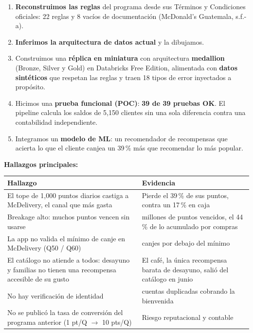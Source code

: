 \documentclass[12pt,a4paper]{article}
\begin{document}
\begin{enumerate}[leftmargin=1.4em]
\item \textbf{Reconstruimos las reglas} del programa desde sus Términos y Condiciones oficiales:
22 reglas y 8 vacíos de documentación (McDonald's Guatemala, s.f.-a).
\item \textbf{Inferimos la arquitectura de datos actual} y la dibujamos.
\item Construimos una \textbf{réplica en miniatura} con arquitectura \textbf{medallion} (Bronze,
Silver y Gold) en Databricks Free Edition, alimentada con \textbf{datos sintéticos} que respetan
las reglas y traen 18 tipos de error inyectados a propósito.
\item Hicimos una \textbf{prueba funcional (POC)}: \textbf{39 de 39 pruebas OK}. El pipeline
calcula los saldos de 5,150 clientes sin una sola diferencia contra una contabilidad
independiente.
\item Integramos un \textbf{modelo de ML}: un recomendador de recompensas que acierta lo que el
cliente canjea un 39\,\% más que recomendar lo más popular.
\end{enumerate}

\textbf{Hallazgos principales:}

\begin{center}
\renewcommand{\arraystretch}{1.4}
\begin{tabular}{|>{\raggedright\arraybackslash}p{7.2cm}|>{\raggedright\arraybackslash}p{6.4cm}|}
\hline
\textbf{Hallazgo} & \textbf{Evidencia} \\
\hline
El tope de 1,000 puntos diarios castiga a McDelivery, el canal que más gasta & Pierde el 39\,\%
de sus puntos, contra un 17\,\% en caja \\
\hline
Breakage alto: muchos puntos vencen sin usarse & 8.1 millones de puntos vencidos, el 44\,\% de lo
acumulado por compras \\
\hline
La app no valida el mínimo de canje en McDelivery (Q50 / Q60) & 33 canjes por debajo del
mínimo \\
\hline
El catálogo no atiende a todos: desayuno y familias no tienen una recompensa accesible de su
gusto & El café, la única recompensa barata de desayuno, salió del catálogo en junio \\
\hline
No hay verificación de identidad & 150 cuentas duplicadas cobrando la bienvenida \\
\hline
No se publicó la tasa de conversión del programa anterior (1 pt/Q $\rightarrow$ 10 pts/Q) &
Riesgo reputacional y contable \\
\hline
\end{tabular}
\end{center}
\end{document}
